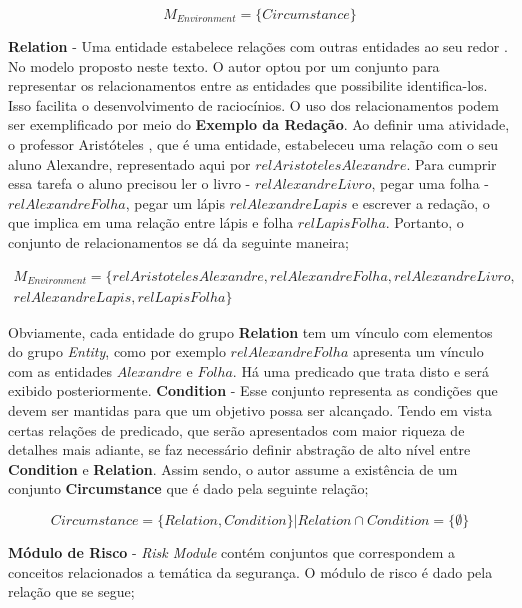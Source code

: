 \begin{equation}
    M_{Environment} = \{  Circumstance  \}
\end{equation}

\textbf{Relation} - Uma entidade estabelece relações com outras entidades ao seu redor \cite{entity}. No modelo proposto neste texto. O autor optou por um conjunto para representar os relacionamentos entre as entidades que possibilite identifica-los. Isso facilita o desenvolvimento de raciocínios. O uso 
dos relacionamentos podem ser exemplificado por meio do \textbf{Exemplo da Redação}. Ao definir uma atividade, o professor Aristóteles
, que é uma entidade, estabeleceu uma relação com o seu aluno Alexandre, representado aqui por $relAristotelesAlexandre$. Para cumprir essa tarefa o aluno precisou ler o livro - $relAlexandreLivro$, pegar uma folha - $relAlexandreFolha$,  pegar um lápis $relAlexandreLapis$ e escrever a redação, o que implica em uma relação entre lápis e folha $relLapisFolha$. Portanto, o conjunto de relacionamentos se dá da seguinte maneira;

\begin{eqnarray}\label{Environment}\nonumber
    M_{Environment} = \{ relAristotelesAlexandre, relAlexandreFolha, relAlexandreLivro, \\ \nonumber
     relAlexandreLapis, relLapisFolha \}
\end{eqnarray}

Obviamente, cada entidade do grupo \textbf{Relation} tem um vínculo com elementos do grupo \textit{Entity}, como por exemplo $relAlexandreFolha$ apresenta um vínculo com as entidades $Alexandre$ e $Folha$. Há uma predicado que trata disto e será exibido posteriormente. \textbf{Condition} - Esse conjunto representa as condições que devem ser mantidas para que um objetivo possa ser alcançado. Tendo em vista certas relações de predicado, que serão apresentados com maior riqueza de detalhes mais adiante, se faz necessário definir abstração de alto nível entre \textbf{Condition} e \textbf{Relation}. Assim sendo, o autor assume a existência de um conjunto \textbf{Circumstance} que é dado pela seguinte relação; 

\begin{equation}
    Circumstance = \{ Relation, Condition \} |  Relation \cap Condition = \{ \emptyset \}
\end{equation}


\textbf{Módulo de Risco} - \textit{Risk Module} contém conjuntos que correspondem a conceitos relacionados a temática da segurança.
O módulo de risco é dado pela relação que se segue;

